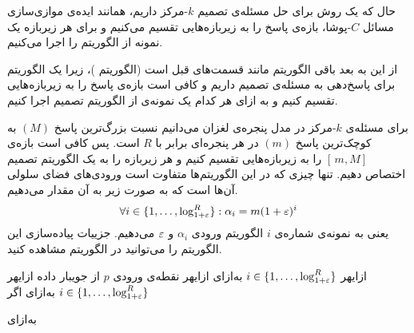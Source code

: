 حال که یک روش برای حل مسئله‌ی تصمیم $k$-مرکز داریم، همانند ایده‌ی موازی‌سازی مسائل $C$-پوشا، بازه‌ی پاسخ را به زیربازه‌هایی تقسیم می‌کنیم و برای هر زیربازه یک نمونه از الگوریتم  را اجرا می‌کنیم.

از این به بعد باقی الگوریتم مانند قسمت‌های قبل است (الگوریتم )، زیرا یک الگوریتم برای پاسخ‌دهی به مسئله‌ی تصمیم داریم و کافی است بازه‌ی پاسخ را به زیربازه‌هایی تقسیم کنیم و به ازای هر کدام یک نمونه‌ی از الگوریتم تصمیم اجرا کنیم.

برای مسئله‌ی $k$-مرکز در مدل پنجره‌ی لغزان می‌دانیم نسبت بزرگ‌ترین پاسخ $(M)$ به کوچک‌ترین پاسخ $(m)$ در هر پنجره‌ای برابر با $R$ است. پس کافی است بازه‌ی 
$ [\, m, M]\,$
را به زیربازه‌هایی تقسیم کنیم و هر زیربازه را به یک الگوریتم تصمیم اختصاص دهیم. تنها چیزی که در این الگوریتم‌ها متفاوت است ورودی‌های فضای سلولی آن‌ها است که به صورت زیر به آن مقدار می‌دهیم.
$$ \forall i \in  \{1, \ldots, \log_{1+\varepsilon}^{R} \}: \alpha_i = m  (1+\varepsilon)^i$$
یعنی به نمونه‌ی شماره‌ی $i$  الگوریتم  ورودی $\alpha_i$ و $\varepsilon$ می‌دهیم. جزییات پیاده‌سازی این الگوریتم را می‌توانید در الگوریتم  مشاهده کنید.

‌ازای{هر $ i \in  \{1, \ldots, \log_{1+\varepsilon}^{R} \}$ }
‌به‌ازای{}
‌ازای{هر نقطه‌ی ورودی $p$ از جویبار داده}
‌ازای{هر$ i \in  \{1, \ldots, \log_{1+\varepsilon}^{R} \}$ }
‌به‌ازای{}
‌اگر{}

‌به‌ازای{}

